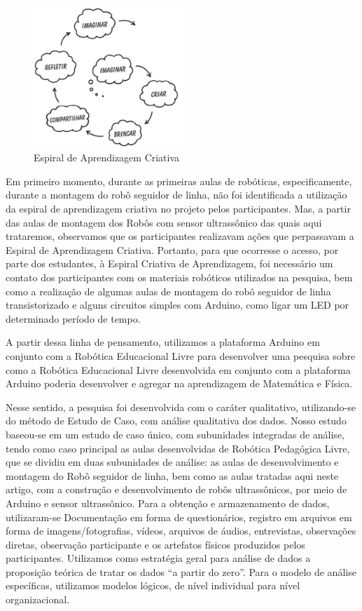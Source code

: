 \documentclass{textolivre}
\begin{document}
\begin{figure}[htbp]
 \centering
 \includegraphics[width=0.5\textwidth]{fig-001.png}
 \caption{Espiral de Aprendizagem Criativa}
 \label{fig1}
\end{figure}

Em primeiro momento, durante as primeiras aulas de robóticas, especificamente, durante a montagem do robô seguidor de linha, não foi identificada a utilização da espiral de aprendizagem criativa no projeto pelos participantes. Mas, a partir das aulas de montagem dos Robôs com sensor ultrassônico das quais aqui trataremos, observamos que os participantes realizavam ações que perpassavam a Espiral de Aprendizagem Criativa. Portanto, para que ocorresse o acesso, por parte dos estudantes, à Espiral Criativa de Aprendizagem, foi necessário um contato dos participantes com os materiais robóticos utilizados na pesquisa, bem como a realização de algumas aulas de montagem do robô seguidor de linha transistorizado e alguns circuitos simples com Arduino, como ligar um LED por determinado período de tempo.

A partir dessa linha de pensamento, utilizamos a plataforma Arduino em conjunto com a Robótica Educacional Livre para desenvolver uma pesquisa sobre como a Robótica Educacional Livre desenvolvida em conjunto com a plataforma Arduino poderia desenvolver e agregar na aprendizagem de Matemática e Física.

Nesse sentido, a pesquisa foi desenvolvida com o caráter qualitativo, utilizando-se do método de Estudo de Caso, com análise qualitativa dos dados. Nosso estudo baseou-se em um estudo de caso único, com subunidades integradas de análise, tendo como caso principal as aulas desenvolvidas de Robótica Pedagógica Livre, que se dividiu em duas subunidades de análise: as aulas de desenvolvimento e montagem do Robô seguidor de linha, bem como as aulas tratadas aqui neste artigo, com a construção e desenvolvimento de robôs ultrassônicos, por meio de Arduino e sensor ultrassônico. Para a obtenção e armazenamento de dados, utilizaram-se Documentação em forma de questionários, registro em arquivos em forma de imagens/fotografias, vídeos, arquivos de áudios, entrevistas, observações diretas, observação participante e os artefatos físicos produzidos pelos participantes. Utilizamos como estratégia geral para análise de dados a proposição teórica de tratar os dados “a partir do zero”. Para o modelo de análise específicas, utilizamos modelos lógicos, de nível individual para nível organizacional.
\end{document}

